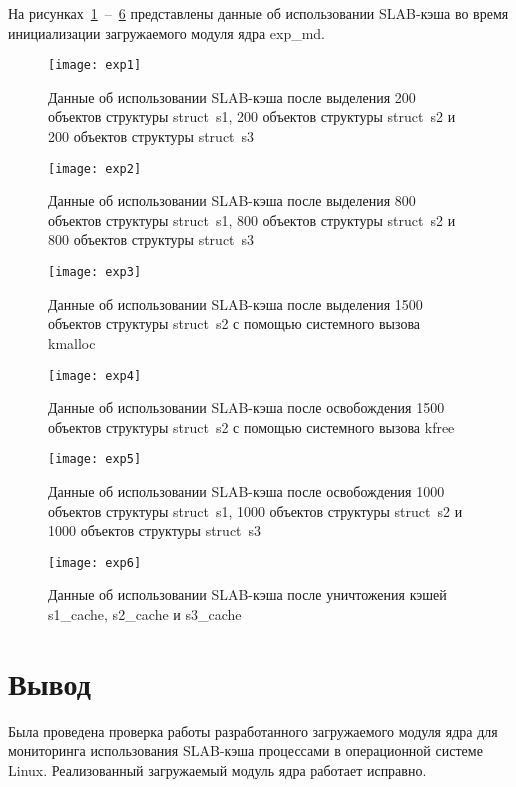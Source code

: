 На рисунках~\ref{exp1}~--~\ref{exp6} представлены данные об использовании SLAB-кэша во время инициализации загружаемого модуля ядра exp\_md.
\begin{figure}[H]
	\centering
	\texttt{[image: exp1]}
	\caption{Данные об использовании SLAB-кэша после выделения 200 объектов структуры struct~s1, 200 объектов структуры struct~s2 и 200 объектов структуры struct~s3}
	\label{exp1}
\end{figure}
\begin{figure}[H]
	\centering
	\texttt{[image: exp2]}
	\caption{Данные об использовании SLAB-кэша после выделения 800 объектов структуры struct~s1, 800 объектов структуры struct~s2 и 800 объектов структуры struct~s3}
	\label{exp2}
\end{figure}
\begin{figure}[H]
	\centering
	\texttt{[image: exp3]}
	\caption{Данные об использовании SLAB-кэша после выделения 1500 объектов структуры struct~s2 с помощью системного вызова kmalloc}
	\label{exp3}
\end{figure}
\begin{figure}[H]
	\centering
	\texttt{[image: exp4]}
	\caption{Данные об использовании SLAB-кэша после освобождения 1500 объектов структуры struct~s2 с помощью системного вызова kfree}
	\label{exp4}
\end{figure}
\begin{figure}[H]
	\centering
	\texttt{[image: exp5]}
	\caption{Данные об использовании SLAB-кэша после освобождения 1000 объектов структуры struct~s1, 1000 объектов структуры struct~s2 и 1000 объектов структуры struct~s3}
	\label{exp5}
\end{figure}
\begin{figure}[H]
	\centering
	\texttt{[image: exp6]}
	\caption{Данные об использовании SLAB-кэша после уничтожения кэшей s1\_cache, s2\_cache и s3\_cache}
	\label{exp6}
\end{figure}

\section{Вывод}

Была проведена проверка работы разработанного загружаемого модуля ядра для мониторинга использования SLAB-кэша процессами в операционной системе Linux.
Реализованный загружаемый модуль ядра работает исправно.

\clearpage
